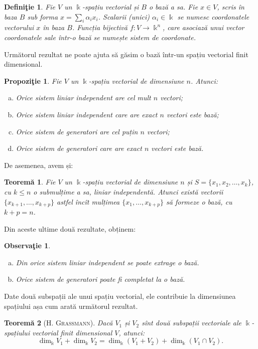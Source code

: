 \documentclass[11pt,a4paper]{article}
\theoremstyle{dotless}
\newtheorem{theorem}{Teorem\u{a}}[section]
\newtheorem{proposition}{Propozi\c{t}ie}[section]
\theoremstyle{dotlessdr}
\newtheorem{definition}{Defini\c{t}ie}[section]
\newtheorem{remark}{Observa\c{t}ie}[section]
\begin{document}
\begin{definition}
Fie $V$ un $\Bbbk$-spațiu vectorial și $B$ o bază a sa. Fie $x \in V$, scris în 
baza $B$ sub forma $x = \sum_i \alpha_i x_i$. Scalarii (unici) 
$\alpha_i \in \Bbbk$ se numesc \emph{coordonatele} vectorului $x$ în baza $B$. 
Funcția bijectivă $f : V \to \Bbbk^n$, care asociază unui vector coordonatele 
sale într-o bază se numește \emph{sistem de coordonate}.
\end{definition}

Următorul rezultat ne poate ajuta să găsim o bază într-un spațiu vectorial 
finit dimensional.

\begin{proposition}
Fie $V$ un $\Bbbk$-spațiu vectorial de dimensiune $n$. Atunci:
\begin{enumerate}[(a)]
\item Orice sistem liniar independent are cel mult $n$ vectori;
\item Orice sistem liniar independent care are exact $n$ vectori este bază;
\item Orice sistem de generatori are cel puțin $n$ vectori;
\item Orice sistem de generatori care are exact $n$ vectori este bază.
\end{enumerate}
\end{proposition}

De asemenea, avem și:
\begin{theorem}
Fie $V$ un $\Bbbk$-spațiu vectorial de dimensiune $n$ și 
$S = \{x_1, x_2, \dots, x_k\}$, cu $k \leq n$ o submulțime a sa, liniar 
independentă. Atunci există vectorii $\{x_{k+1}, \dots, x_{k+p}\}$ astfel 
încît mulțimea $\{x_1,\dots, x_{k+p}\}$ să formeze o bază, cu $k + p = n$.
\end{theorem}

Din aceste ultime două rezultate, obținem:
\begin{remark}
\begin{enumerate}[(a)]
\item Din orice sistem liniar independent se poate extrage o bază.
\item Orice sistem de generatori poate fi completat la o bază.
\end{enumerate}
\end{remark}

Date două subspații ale unui spațiu vectorial, ele contribuie la dimensiunea 
spațiului așa cum arată următorul rezultat.
\begin{theorem}[\textsc{H. Grassmann}]
Dacă $V_1$ și $V_2$ sînt două subspații vectoriale ale $\Bbbk$-spațiului 
vectorial finit dimensional $V$, atunci: 
\[
\dim_\Bbbk V_1 + \dim_\Bbbk V_2=\dim_\Bbbk(V_1 + V_2) + \dim_\Bbbk(V_1\cap V_2).
\]
\end{theorem}
\end{document}
